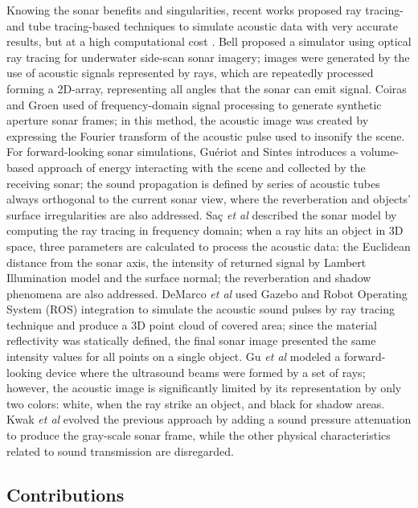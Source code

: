 \documentclass[final,5p,times]{elsarticle}
\begin{document}
Knowing the sonar benefits and singularities, recent works proposed ray tracing- and tube tracing-based techniques to simulate acoustic data with very accurate results, but at a high computational cost \cite{bell1997,coiras2009,gueriot2010,sac2015,demarco2015,gu2013,kwak2015}. Bell \cite{bell1997} proposed a simulator using optical ray tracing for underwater side-scan sonar imagery; images were generated by the use of acoustic signals represented by rays, which are repeatedly processed forming a 2D-array, representing all angles that the sonar can emit signal. Coiras and Groen \cite{coiras2009} used of frequency-domain signal processing to generate synthetic aperture sonar frames; in this method, the acoustic image was created by expressing the Fourier transform of the acoustic pulse used to insonify the scene. For forward-looking sonar simulations, Guériot and Sintes \cite{gueriot2010} introduces a volume-based approach of energy interacting with the scene and collected by the receiving sonar; the sound propagation is defined by series of acoustic tubes always orthogonal to the current sonar view, where the reverberation and objects' surface irregularities are also addressed. Saç \textit{et al} \cite{sac2015} described the sonar model by computing the ray tracing in frequency domain; when a ray hits an object in 3D space, three parameters are calculated to process the acoustic data: the Euclidean distance from the sonar axis, the intensity of returned signal by Lambert Illumination model and the surface normal; the reverberation and shadow phenomena are also addressed. DeMarco \textit{et al} \cite{demarco2015} used Gazebo and Robot Operating System (ROS) \cite{quigley2009} integration to simulate the acoustic sound pulses by ray tracing technique and produce a 3D point cloud of covered area; since the material reflectivity was statically defined, the final sonar image presented the same intensity values for all points on a single object. Gu \textit{et al} \cite{gu2013} modeled a forward-looking device where the ultrasound beams were formed by a set of rays; however, the acoustic image is significantly limited by its representation by only two colors: white, when the ray strike an object, and black for shadow areas. Kwak \textit{et al} \cite{kwak2015} evolved the previous approach by adding a sound pressure attenuation to produce the gray-scale sonar frame, while the other physical characteristics related to sound transmission are disregarded.

\subsection{Contributions}
\end{document}
